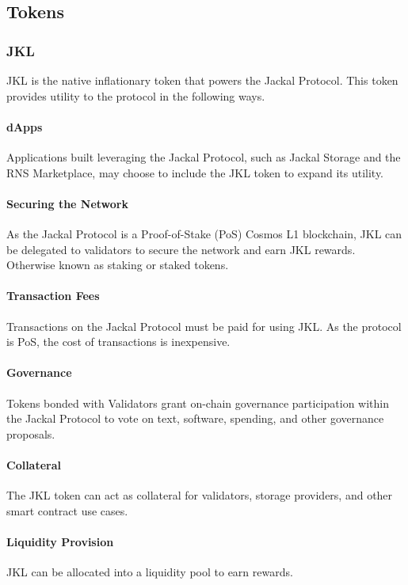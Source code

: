 \documentclass[a4paper]{article}
\begin{document}
\subsection{Tokens}
\subsubsection{JKL}
JKL is the native inflationary token that powers the Jackal Protocol. This token provides utility to the protocol in the following ways. 

\paragraph{dApps}
Applications built leveraging the Jackal Protocol, such as Jackal Storage and the RNS Marketplace, may choose to include the JKL token to expand its utility. 

\paragraph{Securing the Network}
As the Jackal Protocol is a Proof-of-Stake (PoS) Cosmos L1 blockchain, JKL can be delegated to validators to secure the network and earn JKL rewards. Otherwise known as staking or staked tokens.

\paragraph{Transaction Fees}
Transactions on the Jackal Protocol must be paid for using JKL. As the protocol is PoS, the cost of transactions is inexpensive. 

\paragraph{Governance}
Tokens bonded with Validators grant on-chain governance participation within the Jackal Protocol to vote on text, software, spending, and other governance proposals. 

\paragraph{Collateral}
The JKL token can act as collateral for validators, storage providers, and other smart contract use cases. 

\paragraph{Liquidity Provision}
JKL can be allocated into a liquidity pool to earn rewards. 
\end{document}
